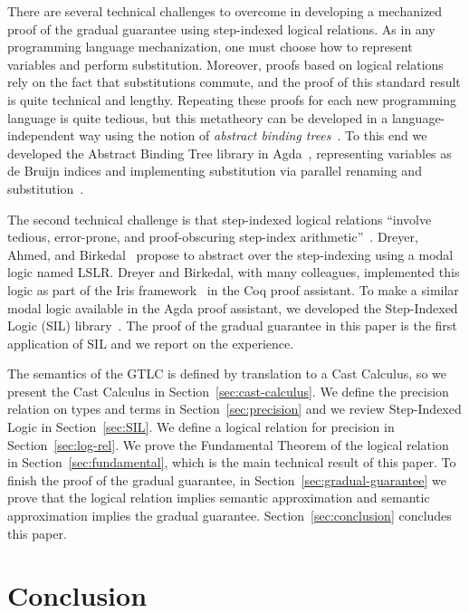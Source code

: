 \documentclass[submission,copyright,creativecommons]{eptcs}
\begin{document}
There are several technical challenges to overcome in developing a
mechanized proof of the gradual guarantee using step-indexed logical
relations. As in any programming language mechanization, one must
choose how to represent variables and perform substitution. Moreover,
proofs based on logical relations rely on the fact that substitutions
commute, and the proof of this standard result is quite technical and
lengthy. Repeating these proofs for each new programming language is
quite tedious, but this metatheory can be developed in a
language-independent way using the notion of \emph{abstract binding
  trees}~\cite{Harper:2012aa}. To this end we developed the Abstract
Binding Tree library in Agda~\cite{Siek:2021to}, representing
variables as de Bruijn indices and implementing substitution via
parallel renaming and
substitution~\cite{McBride:2005aa,Wadler:2020aa}.

The second technical challenge is that step-indexed logical relations
``involve tedious, error-prone, and proof-obscuring step-index
arithmetic''~\cite{Dreyer:2011wl}. Dreyer, Ahmed, and
Birkedal~\cite{Dreyer:2011wl} propose to abstract over the
step-indexing using a modal logic named LSLR. Dreyer and Birkedal,
with many colleagues, implemented this logic as part of the Iris
framework~\cite{JUNG:2018aa} in the Coq proof assistant. To make a
similar modal logic available in the Agda proof assistant, we
developed the Step-Indexed Logic (SIL) library~\cite{Siek:2023aa}.
The proof of the gradual guarantee in this paper is the first
application of SIL and we report on the experience.

The semantics of the GTLC is defined by translation to a Cast
Calculus, so we present the Cast Calculus in
Section~\ref{sec:cast-calculus}. We define the precision relation on
types and terms in Section~\ref{sec:precision} and we review
Step-Indexed Logic in Section~\ref{sec:SIL}.  We define a logical
relation for precision in Section~\ref{sec:log-rel}. We prove the
Fundamental Theorem of the logical relation in
Section~\ref{sec:fundamental}, which is the main technical result of
this paper. To finish the proof of the gradual guarantee, in
Section~\ref{sec:gradual-guarantee} we prove that the logical relation
implies semantic approximation and semantic approximation implies the
gradual guarantee. Section~\ref{sec:conclusion} concludes this paper.






\section{Conclusion}





\end{document}
